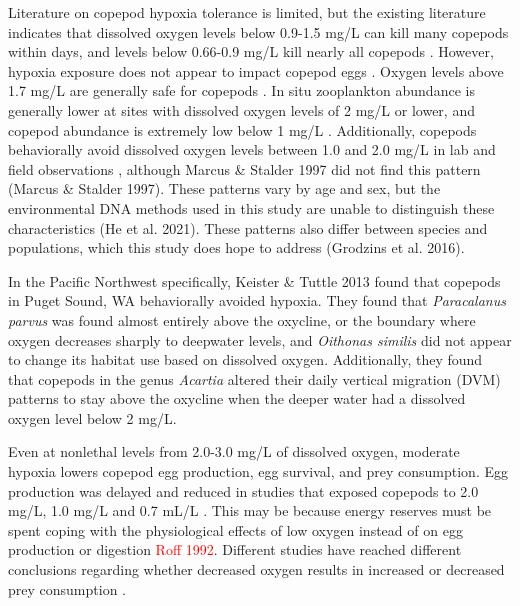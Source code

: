 \documentclass[12pt,twoside]{reedthesis}
\begin{document}
Literature on copepod hypoxia tolerance is limited, but the existing literature indicates that dissolved oxygen levels below 0.9-1.5 mg/L can kill many copepods within days, and levels below 0.66-0.9 mg/L kill nearly all copepods \autocite{He2021, Marcus2004, Stalder1997, Grodzins2016}. However, hypoxia exposure does not appear to impact copepod eggs \autocite{Invidia2004}. Oxygen levels above 1.7 mg/L are generally safe for copepods \autocite{Grodzins2016}. In situ zooplankton abundance is generally lower at sites with dissolved oxygen levels of 2 mg/L or lower, and copepod abundance is extremely low below 1 mg/L \autocite{Keister2020, Roman1993}. Additionally, copepods behaviorally avoid dissolved oxygen levels between 1.0 and 2.0 mg/L in lab and field observations \autocite{Keister2020, Roman1993, He2021, Elliott2012, Keister2013}, although Marcus \& Stalder 1997 did not find this pattern (Marcus \& Stalder 1997). These patterns vary by age and sex, but the environmental DNA methods used in this study are unable to distinguish these characteristics (He et al. 2021). These patterns also differ between species and populations, which this study does hope to address (Grodzins et al. 2016). 

In the Pacific Northwest specifically, Keister \& Tuttle 2013 found that copepods in Puget Sound, WA behaviorally avoided hypoxia. They found that \textit{Paracalanus parvus} was found almost entirely above the oxycline, or the boundary where oxygen decreases sharply to deepwater levels, and \textit{Oithonas similis} did not appear to change its habitat use based on dissolved oxygen. Additionally, they found that copepods in the genus \textit{Acartia} altered their daily vertical migration (DVM) patterns to stay above the oxycline when the deeper water had a dissolved oxygen level below 2 mg/L.

Even at nonlethal levels from 2.0-3.0 mg/L of dissolved oxygen, moderate hypoxia lowers copepod egg production, egg survival, and prey consumption. Egg production was delayed and reduced in studies that exposed copepods to 2.0 mg/L, 1.0 mg/L and 0.7 mL/L \autocite{Marcus2004, Richmond2006, Roman1993}. This may be because energy reserves must be spent coping with the physiological effects of low oxygen instead of on egg production or digestion \autocite{Marcus2004, Elliott2013, Lutz1992, Stalder1997} \textcolor{red}{Roff 1992}.  Different studies have reached different conclusions regarding whether decreased oxygen results in increased or decreased prey consumption \autocite{He2021, Elliott2013}. 
\end{document}
